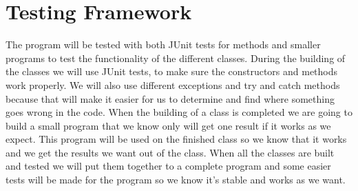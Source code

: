 \documentclass[a4paper,11pt,twoside]{article}
\begin{document}
\section{Testing Framework}
The program will be tested with both JUnit tests for methods and
smaller programs to test the functionality of the different classes.
During the building of the classes we will use JUnit tests, to make
sure the constructors and methods work properly. We will also use
different exceptions and try and catch methods because that will make
it easier for us to determine and find where something goes wrong in
the code. When the building of a class is completed we are going to
build a small program that we know only will get one result if it
works as we expect. This program will be used on the finished class so
we know that it works and we get the results we want out of the
class. When all the classes are built and tested we will put them
together to a complete program and some easier tests will be made for
the program so we know it’s stable and works as we want.  


\end{document}
